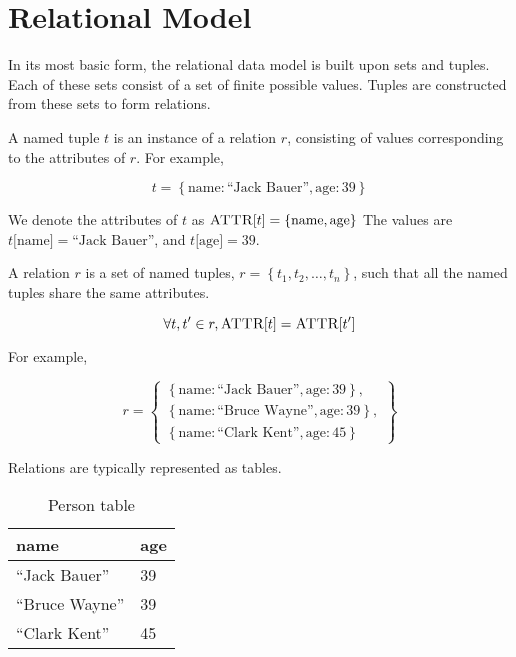 \section{Relational Model}
	In its most basic form, the relational data model is built upon sets and tuples.  Each of these sets consist of a set of finite possible values.  Tuples are constructed from these sets to form relations.
	
	\begin{defn}
	\label{def:named-tuple}
		A named tuple $t$ is an instance of a relation $r$, consisting of values corresponding to the attributes of $r$.  For example,
		
		$$t = \left\{\mathrm{name}: \textrm{``Jack Bauer''}, \mathrm{age}: 39\right\}$$
		
		We denote the attributes of $t$ as $\textsc{ATTR}\lbrack t\rbrack = \left\{\mathrm{name}, \mathrm{age}\right\}$  The values are $t\lbrack \mathrm{name}\rbrack = \textrm{``Jack Bauer''}$, and $t\lbrack \mathrm{age}\rbrack = 39$.
	\end{defn}
	
	\begin{defn}[Relation]
	\label{def:relation}
		A relation $r$ is a set of named tuples, $r = \left\{t_1, t_2, \dotsc, t_n\right\}$, such that all the named tuples share the same attributes.
		
		$$\forall t, t' \in r, \textsc{ATTR}\lbrack t\rbrack = \textsc{ATTR}\lbrack t'\rbrack$$
		
		For example,
		
		$$r = \left\{
			\begin{array}{l}
				\left\{\mathrm{name}: \textrm{``Jack Bauer''}, \mathrm{age}: 39\right\}, \\
				\left\{\mathrm{name}: \textrm{``Bruce Wayne''}, \mathrm{age}: 39\right\}, \\
				\left\{\mathrm{name}: \textrm{``Clark Kent''}, \mathrm{age}: 45\right\}
			\end{array}
		\right\}$$
		
		Relations are typically represented as tables.
		
		\begin{table}[!ht]
			\centering
			\begin{tabular}{ll}
				\toprule
				name & age \\
				\midrule
				``Jack Bauer'' & 39 \\
				``Bruce Wayne'' & 39 \\
				``Clark Kent'' & 45 \\
				\bottomrule
			\end{tabular}
			
			\caption{Person table}
			\label{tbl:person}
		\end{table}
	\end{defn}
	
